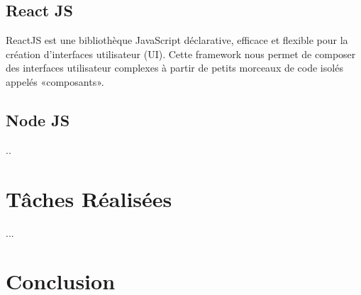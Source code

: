\subsection{React JS} 
ReactJS  \cite{1} est une bibliothèque JavaScript déclarative, efficace et flexible pour la création d'interfaces utilisateur (UI).
Cette framework nous permet de composer des interfaces utilisateur complexes à partir de petits morceaux de code isolés appelés «composants».

\subsection{Node JS}
..

\section{Tâches Réalisées }
...



\section{Conclusion}
